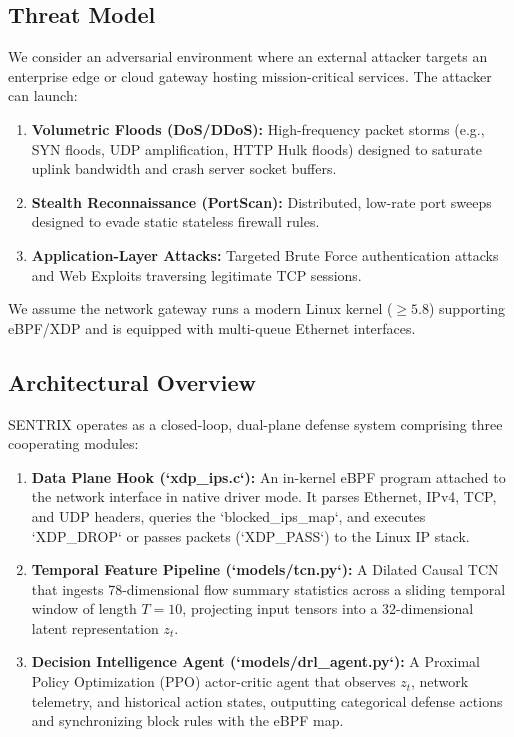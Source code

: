 \documentclass[conference,10pt]{IEEEtran}
\begin{document}
\subsection{Threat Model}
We consider an adversarial environment where an external attacker targets an enterprise edge or cloud gateway hosting mission-critical services. The attacker can launch:
\begin{enumerate}
    \item \textbf{Volumetric Floods (DoS/DDoS):} High-frequency packet storms (e.g., SYN floods, UDP amplification, HTTP Hulk floods) designed to saturate uplink bandwidth and crash server socket buffers.
    \item \textbf{Stealth Reconnaissance (PortScan):} Distributed, low-rate port sweeps designed to evade static stateless firewall rules.
    \item \textbf{Application-Layer Attacks:} Targeted Brute Force authentication attacks and Web Exploits traversing legitimate TCP sessions.
\end{enumerate}

We assume the network gateway runs a modern Linux kernel ($\ge 5.8$) supporting eBPF/XDP and is equipped with multi-queue Ethernet interfaces.

\subsection{Architectural Overview}
SENTRIX operates as a closed-loop, dual-plane defense system comprising three cooperating modules:
\begin{enumerate}
    \item \textbf{Data Plane Hook (`xdp_ips.c`):} An in-kernel eBPF program attached to the network interface in native driver mode. It parses Ethernet, IPv4, TCP, and UDP headers, queries the `blocked_ips_map`, and executes `XDP_DROP` or passes packets (`XDP_PASS`) to the Linux IP stack.
    \item \textbf{Temporal Feature Pipeline (`models/tcn.py`):} A Dilated Causal TCN that ingests 78-dimensional flow summary statistics across a sliding temporal window of length $T=10$, projecting input tensors into a 32-dimensional latent representation $z_t$.
    \item \textbf{Decision Intelligence Agent (`models/drl_agent.py`):} A Proximal Policy Optimization (PPO) actor-critic agent that observes $z_t$, network telemetry, and historical action states, outputting categorical defense actions and synchronizing block rules with the eBPF map.
\end{enumerate}
\end{document}
